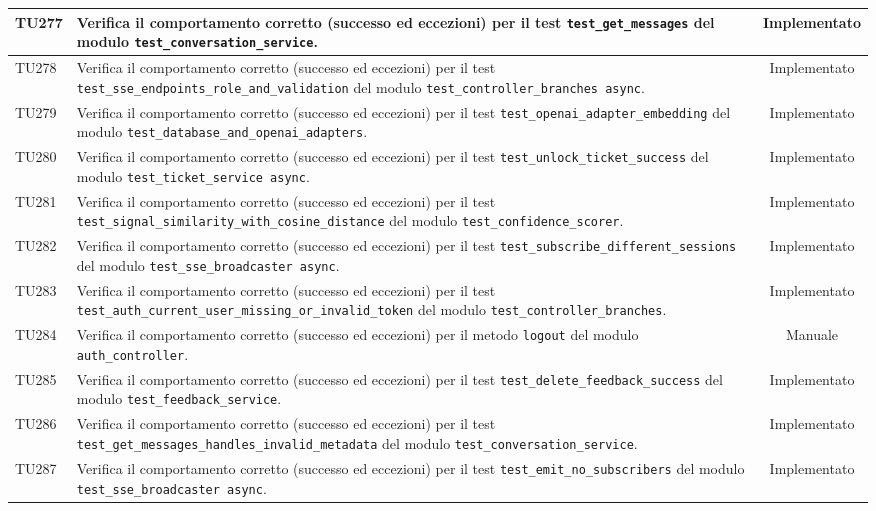 \documentclass[a4paper,11pt,oneside]{scrartcl}
\begin{document}
\begin{longtable}{|p{1.9cm}|p{11.6cm}|c|}
    TU277 & Verifica il comportamento corretto (successo ed eccezioni) per il test \texttt{test\_get\_messages} del modulo \texttt{test\_conversation\_service}. & Implementato \\ \hline
    TU278 & Verifica il comportamento corretto (successo ed eccezioni) per il test \texttt{test\_sse\_endpoints\_role\_and\_validation} del modulo \texttt{test\_controller\_branches async}. & Implementato \\ \hline
    TU279 & Verifica il comportamento corretto (successo ed eccezioni) per il test \texttt{test\_openai\_adapter\_embedding} del modulo \texttt{test\_database\_and\_openai\_adapters}. & Implementato \\ \hline
    TU280 & Verifica il comportamento corretto (successo ed eccezioni) per il test \texttt{test\_unlock\_ticket\_success} del modulo \texttt{test\_ticket\_service     async}. & Implementato \\ \hline
    TU281 & Verifica il comportamento corretto (successo ed eccezioni) per il test \texttt{test\_signal\_similarity\_with\_cosine\_distance} del modulo \texttt{test\_confidence\_scorer}. & Implementato \\ \hline
    TU282 & Verifica il comportamento corretto (successo ed eccezioni) per il test \texttt{test\_subscribe\_different\_sessions} del modulo \texttt{test\_sse\_broadcaster     async}. & Implementato \\ \hline
    TU283 & Verifica il comportamento corretto (successo ed eccezioni) per il test \texttt{test\_auth\_current\_user\_missing\_or\_invalid\_token} del modulo \texttt{test\_controller\_branches}. & Implementato \\ \hline
    TU284 & Verifica il comportamento corretto (successo ed eccezioni) per il metodo \texttt{logout} del modulo \texttt{auth\_controller}. & Manuale \\ \hline
    TU285 & Verifica il comportamento corretto (successo ed eccezioni) per il test \texttt{test\_delete\_feedback\_success} del modulo \texttt{test\_feedback\_service}. & Implementato \\ \hline
    TU286 & Verifica il comportamento corretto (successo ed eccezioni) per il test \texttt{test\_get\_messages\_handles\_invalid\_metadata} del modulo \texttt{test\_conversation\_service}. & Implementato \\ \hline
    TU287 & Verifica il comportamento corretto (successo ed eccezioni) per il test \texttt{test\_emit\_no\_subscribers} del modulo \texttt{test\_sse\_broadcaster     async}. & Implementato \\ \hline

\end{longtable}
\end{document}
